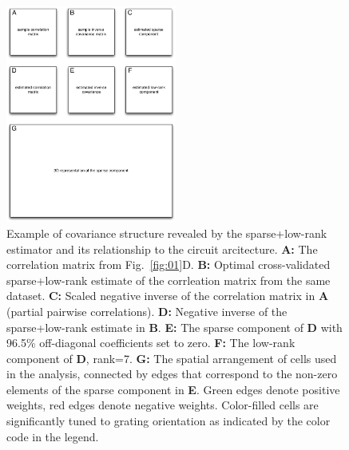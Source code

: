 \begin{figure}[htp]
\centering
\includegraphics[width=0.5\textwidth]{figures/Figure5.pdf}
\caption{
Example of covariance structure revealed by the sparse+low-rank estimator and its relationship to the circuit arcitecture.
{\bf A:} The correlation matrix from Fig.~\ref{fig:01}D. 
{\bf B:} Optimal cross-validated sparse+low-rank estimate of the corrleation matrix from the same dataset. 
{\bf C:} Scaled negative inverse of the correlation matrix in {\bf A} (partial pairwise correlations). 
{\bf D:} Negative inverse of the sparse+low-rank estimate in {\bf B}. 
{\bf E:} The sparse component of {\bf D} with 96.5\% off-diagonal coefficients set to zero.
{\bf F:} The low-rank component of {\bf D}, rank=7.
{\bf G:} The spatial arrangement of cells used in the analysis, connected by edges that correspond to the non-zero elements of the sparse component in {\bf E}. Green edges denote positive weights, red edges denote negative weights.  Color-filled cells are significantly tuned to grating orientation as indicated by the color code in the legend.
}
\label{fig:05}
\end{figure}
